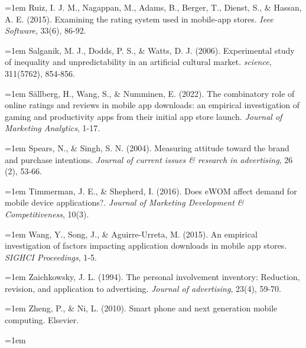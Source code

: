 \hangindent=1em
Ruiz, I. J. M., Nagappan, M., Adams, B., Berger, T., Dienst, S., \& Hassan, A. E. (2015). Examining the rating system used in mobile-app stores. \textit{Ieee Software}, 33(6), 86-92.

\hangindent=1em
Salganik, M. J., Dodds, P. S., \& Watts, D. J. (2006). Experimental study of inequality and unpredictability in an artificial cultural market. \textit{science}, 311(5762), 854-856.

\hangindent=1em
Sällberg, H., Wang, S., \& Numminen, E. (2022). The combinatory role of online ratings and reviews in mobile app downloads: an empirical investigation of gaming and productivity apps from their initial app store launch. \textit{Journal of Marketing Analytics}, 1-17.

\hangindent=1em
Spears, N., \& Singh, S. N. (2004). Measuring attitude toward the brand and purchase intentions. \textit{Journal of current issues \& research in advertising}, 26 (2), 53-66.

\hangindent=1em
Timmerman, J. E., \& Shepherd, I. (2016). Does eWOM affect demand for mobile device applications?. \textit{Journal of Marketing Development \& Competitiveness}, 10(3).

\hangindent=1em
Wang, Y., Song, J., \& Aguirre-Urreta, M. (2015). An empirical investigation of factors impacting application downloads in mobile app stores. \textit{SIGHCI Proceedings}, 1-5.

\hangindent=1em
Zaichkowsky, J. L. (1994). The personal involvement inventory: Reduction, revision, and application to advertising. \textit{Journal of advertising}, 23(4), 59-70.

\hangindent=1em
Zheng, P., \& Ni, L. (2010). Smart phone and next generation mobile computing. Elsevier.

\hangindent=1em
